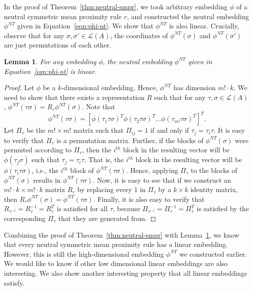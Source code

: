 \documentclass[10pt,letterpaper]{article}
\newcommand{\calL}{{\mathcal{L}}}
\newcommand{\rank}{{\calL(A)}}
\newtheorem{lemma}{Lemma}
\newcommand{\nt}{NT}
\begin{document}
In the proof of Theorem~\ref{thm:neutral-smpr}, we took arbitrary embedding $\phi$ of a neutral symmetric mean proximity rule $r$, and constructed the neutral embedding $\phi^{\nt}$ given in Equation~\eqref{eqn:phi-nt}. We show that $\phi^{\nt}$ is also linear. Crucially, observe that for any $\sigma,\sigma' \in \rank$, the coordinates of $\phi^{\nt}(\sigma)$ and $\phi^{\nt}(\sigma')$ are just permutations of each other.
\begin{lemma}
For any embedding $\phi$, the neutral embedding $\phi^{\nt}$ given in Equation~\eqref{eqn:phi-nt} is linear.
\label{lem:nt-linear}
\end{lemma}
\begin{proof}
Let $\phi$ be a $k$-dimensional embedding. Hence, $\phi^{\nt}$ has dimension $m! \cdot k$. We need to show that there exists a representation $R$ such that for any $\tau,\sigma \in \rank$, $\phi^{\nt}(\tau \sigma) = R_{\tau}\phi^{\nt}(\sigma)$. Note that 
$$
\phi^{\nt}(\tau \sigma) = [\phi(\tau_1 \tau \sigma)^T \phi(\tau_2 \tau \sigma)^T \ldots \phi(\tau_{m!} \tau \sigma)^T]^T.
$$
Let $\Pi_{\tau}$ be the $m! \times m!$ matrix such that $\Pi_{ij} = 1$ if and only if $\tau_j = \tau_i \tau$. It is easy to verify that $\Pi_{\tau}$ is a permutation matrix. Further, if the blocks of $\phi^{\nt}(\sigma)$ were permuted according to $\Pi_{\tau}$, then the $i^{th}$ block in the resulting vector will be $\phi(\tau_j \sigma)$ such that $\tau_j = \tau_i \tau$. That is, the $i^{th}$ block in the resulting vector will be $\phi(\tau_i \tau \sigma)$, i.e., the $i^{th}$ block of $\phi^{\nt}(\tau \sigma)$. Hence, applying $\Pi_{\tau}$ to the blocks of $\phi^{\nt}(\sigma)$ results in $\phi^{\nt}(\tau \sigma)$. Now, it is easy to see that if we construct an $m! \cdot k \times m! \cdot k$ matrix $R_{\tau}$ by replacing every $1$ in $\Pi_{\tau}$ by a $k\times k$ identity matrix, then $R_{\tau} \phi^{\nt}(\sigma) = \phi^{\nt}(\tau \sigma)$. Finally, it is also easy to verify that $R_{\tau^{-1}} = R_{\tau}^{-1} = R_{\tau}^T$ is satisfied for all $\tau$, because $\Pi_{\tau^{-1}} = \Pi_{\tau}^{-1} = \Pi_{\tau}^T$ is satisfied by the corresponding $\Pi_{\tau}$ that they are generated from.
\end{proof}

Combining the proof of Theorem~\ref{thm:neutral-smpr} with Lemma~\ref{lem:nt-linear}, we know that every neutral symmetric mean proximity rule has a linear embedding. However, this is still the high-dimensional embedding $\phi^{\nt}$ we constructed earlier. We would like to know if other low dimensional linear embeddings are also interesting. We also show another interesting property that all linear embeddings satisfy. 
\end{document}
